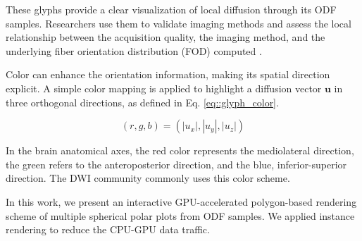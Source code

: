 \documentclass[twoside,twocolumn,10pt]{article}
\begin{document}

These glyphs provide a clear visualization of local diffusion through its ODF samples. Researchers use them to validate imaging methods \cite{descoteaux2007_QBI,  TuchQBall2004,tournier2007,Tournier2004DirectEO, tuch2002,  yeh2010} and assess the local relationship between the acquisition quality, the imaging method, and the underlying fiber orientation distribution (FOD) computed \cite{cho2008, daducci2014,descoteaux2007,  vega2009}. %


Color can enhance the orientation information, making its spatial direction explicit. A simple color mapping is applied to highlight a diffusion vector $\bm{u}$ in three orthogonal directions, as defined in Eq. \ref{eq::glyph_color}.

\begin{equation}
\label{eq::glyph_color}
    (r,g,b) = (|u_x|,|u_y|,|u_z|)
\end{equation}

In the brain anatomical axes, the red color represents the mediolateral direction, the green refers to the anteroposterior direction, and the blue, inferior-superior direction. The DWI community commonly uses this color scheme.


In this work, we present an interactive GPU-accelerated polygon-based rendering scheme of multiple spherical polar plots from ODF samples. We applied instance rendering to reduce the CPU-GPU data traffic.%
\end{document}
